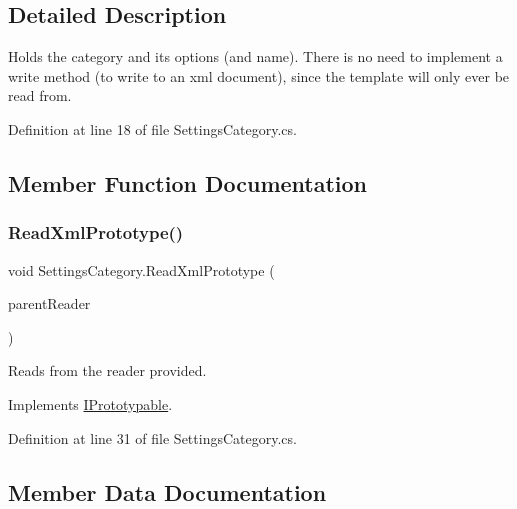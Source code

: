 \subsection{Detailed Description}
Holds the category and its options (and name). There is no need to implement a write method (to write to an xml document), since the template will only ever be read from. 



Definition at line 18 of file Settings\+Category.\+cs.



\subsection{Member Function Documentation}
\mbox{\label{class_settings_category_a5c32c3b741cc15d6971866bbee00bad8}} 
\subsubsection{\texorpdfstring{Read\+Xml\+Prototype()}{ReadXmlPrototype()}}
{\footnotesize\ttfamily void Settings\+Category.\+Read\+Xml\+Prototype (\begin{DoxyParamCaption}\item[{Xml\+Reader}]{parent\+Reader }\end{DoxyParamCaption})}



Reads from the reader provided. 



Implements \hyperlink{interface_i_prototypable_a024d752c4be655a7166db5718f1fad6a}{I\+Prototypable}.



Definition at line 31 of file Settings\+Category.\+cs.



\subsection{Member Data Documentation}
\mbox{\label{class_settings_category_ae29f12a59e2c152efce5cb20ea14b101}} 
